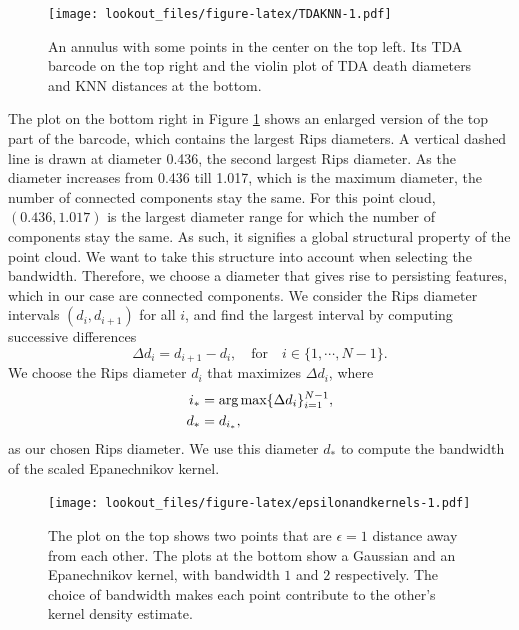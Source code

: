 \documentclass[11pt,a4paper,]{article}
\newcommand{\argmax}{\mathop{\text{arg\,max}}}
\theoremstyle{definition}
\theoremstyle{definition}
\theoremstyle{definition}
\theoremstyle{remark}
\begin{document}
\begin{figure}
\centering
\texttt{[image: lookout\_files/figure-latex/TDAKNN-1.pdf]}
\caption{\label{fig:TDAKNN}An annulus with some points in the center on the top left. Its TDA barcode on the top right and the violin plot of TDA death diameters and KNN distances at the bottom.}
\end{figure}

The plot on the bottom right in Figure \ref{fig:TDAKNN} shows an enlarged version of the top part of the barcode, which contains the largest Rips diameters. A vertical dashed line is drawn at diameter 0.436, the second largest Rips diameter. As the diameter increases from 0.436 till 1.017, which is the maximum diameter, the number of connected components stay the same. For this point cloud, \((0.436, 1.017)\) is the largest diameter range for which the number of components stay the same. As such, it signifies a global structural property of the point cloud. We want to take this structure into account when selecting the bandwidth. Therefore, we choose a diameter that gives rise to persisting features, which in our case are connected components. We consider the Rips diameter intervals \((d_i, d_{i+1})\) for all \(i\), and find the largest interval by computing successive differences
\begin{equation}\label{eq:deathrad1}
    \Delta d_i = d_{i+1} - d_i , \quad \text{for} \quad i \in \{1, \cdots, N-1 \}  .
\end{equation}
We choose the Rips diameter \(d_i\) that maximizes \(\Delta d_i\), where
\begin{align}\label{eq:deathrad2}
    i_* & = \argmax \{ \Delta d_i \}_{i=1}^{N-1}  , \notag \\
    d_* & = d_{i_*}  ,
\end{align}
as our chosen Rips diameter. We use this diameter \(d_*\) to compute the bandwidth of the scaled Epanechnikov kernel.

\begin{figure}
\centering
\texttt{[image: lookout\_files/figure-latex/epsilonandkernels-1.pdf]}
\caption{\label{fig:epsilonandkernels}The plot on the top shows two points that are \(\epsilon = 1\) distance away from each other. The plots at the bottom show a Gaussian and an Epanechnikov kernel, with bandwidth \(1\) and \(2\) respectively. The choice of bandwidth makes each point contribute to the other's kernel density estimate.}
\end{figure}
\end{document}
